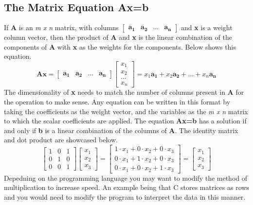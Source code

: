 \documentclass[12pt]{article}
\begin{document}
\subsection{The Matrix Equation Ax=b}
If \textbf{A} is an \textit{m x n} matrix, with columns $\begin{bmatrix}
    \mathbf{a_1} & \mathbf{a_2} & \mathbf{\dots} & \mathbf{a_n}
\end{bmatrix}$ %
and \textbf{x} is a weight column vector, then the product of \textbf{A} and \textbf{x} is the linear combination of the components of %
\textbf{A} with \textbf{x} as the weights for the components. Below shows this equation.
$$
    \boldsymbol{Ax} = 
    \begin{bmatrix}
        \mathbf{a_1} & \mathbf{a_2} & \mathbf{\dots} & \mathbf{a_n}
    \end{bmatrix}
    \begin{bmatrix}
        x_1\\
        x_2\\
        \dots\\
        x_n
    \end{bmatrix} = x_1\mathbf{a_1} + x_2\mathbf{a_2} + \mathbf{\dots} + x_n\mathbf{a_n}
$$
\newline
The dimensionality of \textbf{x} needs to match the number of columns present in \textbf{A} for the operation to make sense. Any equation can be written in this format %
by taking the coefficients as the weight vector, and the variables as the \textit{m x n} matrix to which the scalar coefficients are applied. The equation \textbf{Ax=b} %
has a solution if and only if \textbf{b} is a linear combination of the columns of \textbf{A}.
\newline
\newline
The identity matrix and dot product are showcased below.
$$
\begin{bmatrix}
    1 & 0 & 1\\
    0 & 1 & 0\\
    0 & 0 & 1
\end{bmatrix} \begin{bmatrix}
    x_1\\
    x_2\\
    x_3
\end{bmatrix} = \begin{bmatrix}
    1\cdot x_1 + 0\cdot x_2 + 0\cdot x_3\\
    0\cdot x_1 + 1\cdot x_2 + 0\cdot x_3\\
    0\cdot x_1 + 0\cdot x_2 + 1\cdot x_3
\end{bmatrix} = \begin{bmatrix}
    x_1\\
    x_2\\
    x_3
\end{bmatrix}
$$
\newline
Depedning on the programming language you may want to modify the method of multiplication to increase speed. An example being that C stores matrices as rows and you would %
need to modify the program to interpret the data in this manner. 
\end{document}

